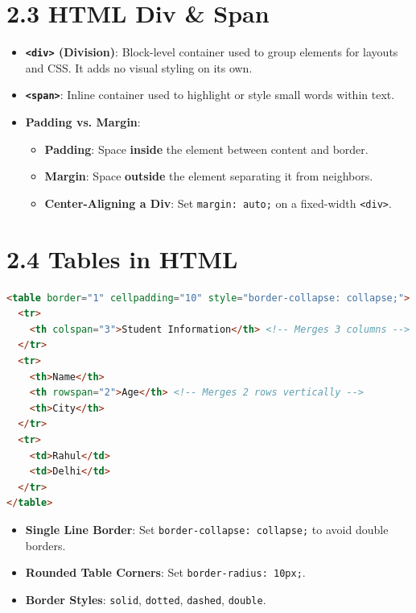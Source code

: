 \section{2.3 HTML Div \& Span}
\begin{itemize}[leftmargin=*]
    \item \textbf{\texttt{<div>} (Division)}: Block-level container used to group elements for layouts and CSS. It adds no visual styling on its own.
    \item \textbf{\texttt{<span>}}: Inline container used to highlight or style small words within text.
    \item \textbf{Padding vs. Margin}:
    \begin{itemize}
        \item \textbf{Padding}: Space \textbf{inside} the element between content and border.
        \item \textbf{Margin}: Space \textbf{outside} the element separating it from neighbors.
        \item \textbf{Center-Aligning a Div}: Set \texttt{margin: auto;} on a fixed-width \texttt{<div>}.
    \end{itemize}
\end{itemize}

\section{2.4 Tables in HTML}
\begin{codeexample}
\begin{lstlisting}[language=HTML]
<table border="1" cellpadding="10" style="border-collapse: collapse;">
  <tr>
    <th colspan="3">Student Information</th> <!-- Merges 3 columns -->
  </tr>
  <tr>
    <th>Name</th>
    <th rowspan="2">Age</th> <!-- Merges 2 rows vertically -->
    <th>City</th>
  </tr>
  <tr>
    <td>Rahul</td>
    <td>Delhi</td>
  </tr>
</table>
\end{lstlisting}
\end{codeexample}

\begin{notebox}
\begin{itemize}[leftmargin=*]
    \item \textbf{Single Line Border}: Set \texttt{border-collapse: collapse;} to avoid double borders.
    \item \textbf{Rounded Table Corners}: Set \texttt{border-radius: 10px;}.
    \item \textbf{Border Styles}: \texttt{solid}, \texttt{dotted}, \texttt{dashed}, \texttt{double}.
\end{itemize}
\end{notebox}

